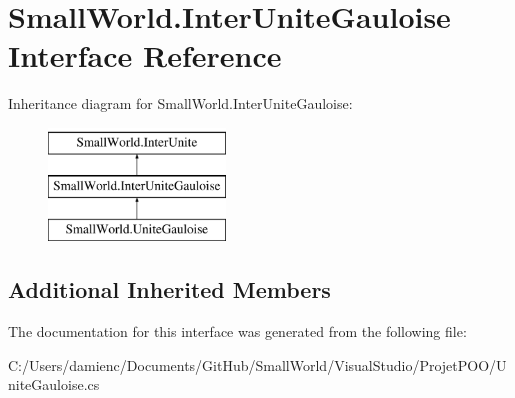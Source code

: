 \hypertarget{interface_small_world_1_1_inter_unite_gauloise}{\section{Small\-World.\-Inter\-Unite\-Gauloise Interface Reference}
\label{interface_small_world_1_1_inter_unite_gauloise}
}
Inheritance diagram for Small\-World.\-Inter\-Unite\-Gauloise\-:\begin{figure}[H]
\begin{center}
\leavevmode
\includegraphics[height=3.000000cm]{interface_small_world_1_1_inter_unite_gauloise}
\end{center}
\end{figure}
\subsection*{Additional Inherited Members}


The documentation for this interface was generated from the following file\-:\begin{DoxyCompactItemize}
\item 
C\-:/\-Users/damienc/\-Documents/\-Git\-Hub/\-Small\-World/\-Visual\-Studio/\-Projet\-P\-O\-O/Unite\-Gauloise.\-cs\end{DoxyCompactItemize}
